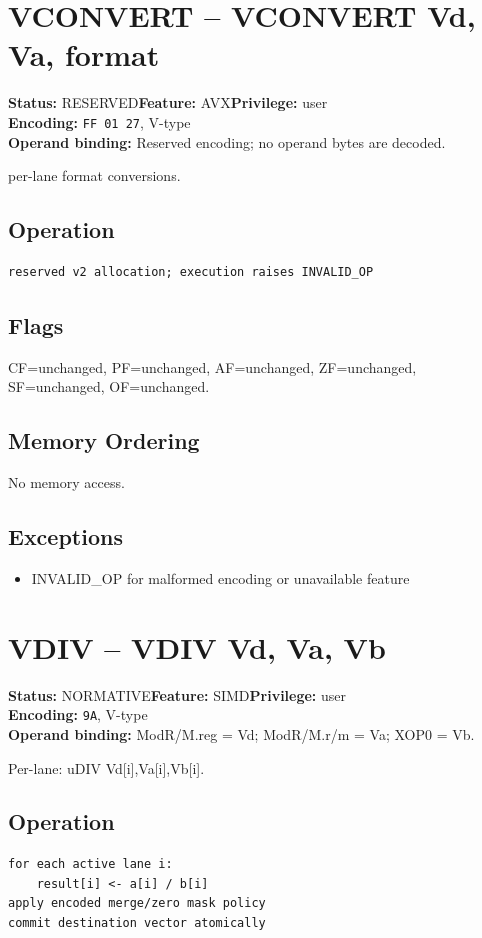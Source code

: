 \documentclass[10pt]{article}
\begin{document}
\section{VCONVERT -- VCONVERT Vd, Va, format}
\textbf{Status:} RESERVED\quad \textbf{Feature:} AVX\quad \textbf{Privilege:} user\\
\textbf{Encoding:} \texttt{FF 01 27}, V-type\\
\textbf{Operand binding:} Reserved encoding; no operand bytes are decoded.

per-lane format conversions.

\subsection*{Operation}
\begin{lstlisting}
reserved v2 allocation; execution raises INVALID_OP
\end{lstlisting}
\subsection*{Flags}
CF=unchanged, PF=unchanged, AF=unchanged, ZF=unchanged, SF=unchanged, OF=unchanged.
\subsection*{Memory Ordering}
No memory access.
\subsection*{Exceptions}
\begin{itemize}
\item INVALID\_OP for malformed encoding or unavailable feature
\end{itemize}
\clearpage

\section{VDIV -- VDIV Vd, Va, Vb}
\textbf{Status:} NORMATIVE\quad \textbf{Feature:} SIMD\quad \textbf{Privilege:} user\\
\textbf{Encoding:} \texttt{9A}, V-type\\
\textbf{Operand binding:} ModR/M.reg = Vd; ModR/M.r/m = Va; XOP0 = Vb.

Per-lane: uDIV Vd[i],Va[i],Vb[i].

\subsection*{Operation}
\begin{lstlisting}
for each active lane i:
    result[i] <- a[i] / b[i]
apply encoded merge/zero mask policy
commit destination vector atomically
\end{lstlisting}
\end{document}
